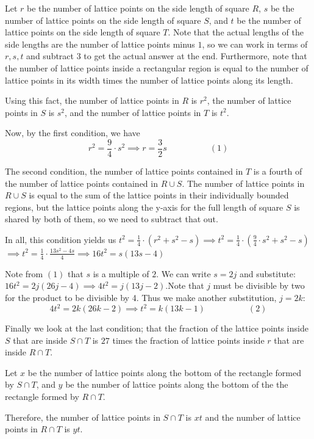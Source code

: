 \begin{enumerate}
Let $r$ be the number of lattice points on the side length of square $R$, $s$ be the number of lattice points on the side length of square $S$, and $t$ be the number of lattice points on the side length of square $T$. Note that the actual lengths of the side lengths are the number of lattice points minus $1$, so we can work in terms of $r, s, t$ and subtract $3$ to get the actual answer at the end. Furthermore, note that the number of lattice points inside a rectangular region is equal to the number of lattice points in its width times the number of lattice points along its length.

 Using this fact, the number of lattice points in $R$ is $r^2$, the number of lattice points in $S$ is $s^2$, and the number of lattice points in $T$ is $t^2$.

 Now, by the first condition, we have 
 \[r^2=\frac{9}{4}\cdot s^2 \implies r = \frac{3}{2}s     \quad \quad \quad \quad \quad (1)\]

 The second condition, the number of lattice points contained in $T$ is a fourth of the number of lattice points contained in $R \cup S$. The number of lattice points in $R \cup S$ is equal to the sum of the lattice points in their individually bounded regions, but the lattice points along the y-axis for the full length of square $S$ is shared by both of them, so we need to subtract that out.

 In all, this condition yields us $t^2 = \frac{1}{4}\cdot(r^2 + s^2 - s )\implies t^2 = \frac{1}{4}\cdot\left(\frac{9}{4}\cdot s^2 + s^2 - s \right)$$\implies t^2=\frac{1}{4}\cdot\frac{13s^2-4s}{4} \implies 16t^2= s(13s-4)$

 Note from $(1)$ that $s$ is a multiple of $2$. We can write $s=2j$ and substitute:$16t^2=2j(26j-4) \implies 4t^2=j(13j-2)$.Note that $j$ must be divisible by two for the product to be divisible by 4. Thus we make another substitution, $j=2k$:
 \[4t^2=2k(26k-2) \implies  t^2 = k(13k-1) \quad \quad \quad \quad \quad (2)\]

 Finally we look at the last condition; that the fraction of the lattice points inside $S$ that are inside $S \cap T$ is $27$ times the fraction of lattice points inside $r$ that are inside $R \cap T$.

 Let $x$ be the number of lattice points along the bottom of the rectangle formed by $S \cap T$, and $y$ be the number of lattice points along the bottom of the the rectangle formed by $R \cap T$.

 Therefore, the number of lattice points in $S\cap T$ is $xt$ and the number of lattice points in $R \cap T$ is $yt$.


\end{enumerate}
